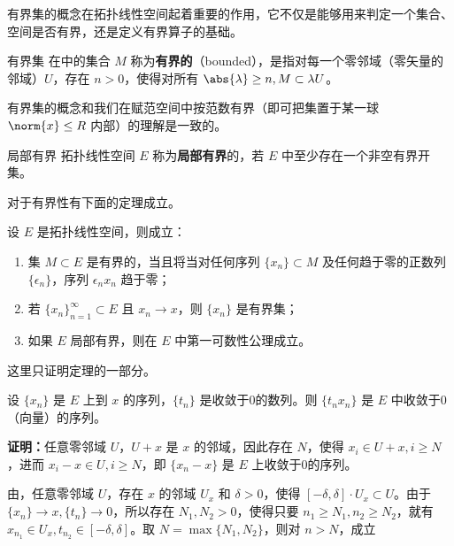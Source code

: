 
有界集的概念在拓扑线性空间起着重要的作用，它不仅是能够用来判定一个集合、空间是否有界，还是定义有界算子的基础。

\begin{definition}{有界集}\label{def_BudSet_1}
在中的集合 $M$ 称为\textbf{有界的}（bounded），是指对每一个零邻域（零矢量的邻域）$U$，存在 $n>0$，使得对所有 $\abs{\lambda}\geq n,M\subset \lambda U$。 
\end{definition}
有界集的概念和我们在赋范空间中按范数有界（即可把集置于某一球 $\norm{x}\leq R$ 内部）的理解是一致的。

\begin{definition}{局部有界}
拓扑线性空间 $E$ 称为\textbf{局部有界}的，若 $E$ 中至少存在一个非空有界开集。
\end{definition}


对于有界性有下面的定理成立。
\begin{theorem}{}\label{the_BudSet_1}
设 $E$ 是拓扑线性空间，则成立：
\begin{enumerate}
\item 集 $M\subset E$ 是有界的，当且将当对任何序列 $\{x_n\}\subset M$ 及任何趋于零的正数列 $\{\epsilon_n\}$，序列 $\epsilon_n x_n$ 趋于零；
\item 若 $\{x_n\}_{n=1}^\infty\subset E$ 且 $x_n\rightarrow x$，则 $\{x_n\}$ 是有界集；
\item 如果 $E$ 局部有界，则在 $E$ 中第一可数性公理成立。 
\end{enumerate}

\end{theorem}
这里只证明定理的一部分。


\begin{lemma}{}\label{lem_BudSet_1}
设 $\{x_n\}$ 是 $E$ 上到 $x$ 的序列，$\{t_n\}$ 是收敛于0的数列。则 $\{t_nx_n\}$ 是 $E$ 中收敛于0（向量）的序列。
\end{lemma}

\textbf{证明：}任意零邻域 $U$，$U+x$ 是 $x$ 的邻域，因此存在 $N$，使得 $x_i\in U+x,i\geq N$，进而 $x_i-x\in U,i\geq N$，即 $\{x_n-x\}$ 是 $E$ 上收敛于0的序列。

由，任意零邻域 $U$，存在 $x$ 的邻域 $U_x$ 和 $\delta>0$，使得 $[-\delta,\delta]\cdot U_x\subset U$。由于 $\{x_n\}\rightarrow x,\{t_n\}\rightarrow0$，所以存在 $N_1,N_2>0$，使得只要 $n_1\geq N_1,n_2\geq N_2$，就有 $x_{n_1}\in U_x,t_{n_2}\in[-\delta,\delta]$。取 $N=\max\{N_1,N_2\}$，则对 $n>N$，成立

